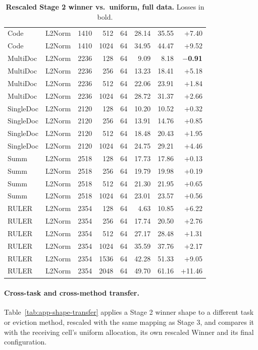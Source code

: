 \begin{table}[t]
\begin{tabular}{@{}l l r r r r r r@{}}
    Code & L2Norm & 1410 & 512 & 64 & 28.14 & 35.55 & +7.40 \\
    Code & L2Norm & 1410 & 1024 & 64 & 34.95 & 44.47 & +9.52 \\
    MultiDoc & L2Norm & 2236 & 128 & 64 & 9.09 & 8.18 & \textbf{$-$0.91} \\
    MultiDoc & L2Norm & 2236 & 256 & 64 & 13.23 & 18.41 & +5.18 \\
    MultiDoc & L2Norm & 2236 & 512 & 64 & 22.06 & 23.91 & +1.84 \\
    MultiDoc & L2Norm & 2236 & 1024 & 64 & 28.72 & 31.37 & +2.66 \\
    SingleDoc & L2Norm & 2120 & 128 & 64 & 10.20 & 10.52 & +0.32 \\
    SingleDoc & L2Norm & 2120 & 256 & 64 & 13.91 & 14.76 & +0.85 \\
    SingleDoc & L2Norm & 2120 & 512 & 64 & 18.48 & 20.43 & +1.95 \\
    SingleDoc & L2Norm & 2120 & 1024 & 64 & 24.75 & 29.21 & +4.46 \\
    Summ & L2Norm & 2518 & 128 & 64 & 17.73 & 17.86 & +0.13 \\
    Summ & L2Norm & 2518 & 256 & 64 & 19.79 & 19.98 & +0.19 \\
    Summ & L2Norm & 2518 & 512 & 64 & 21.30 & 21.95 & +0.65 \\
    Summ & L2Norm & 2518 & 1024 & 64 & 23.01 & 23.57 & +0.56 \\
    RULER & L2Norm & 2354 & 128 & 64 & 4.63 & 10.85 & +6.22 \\
    RULER & L2Norm & 2354 & 256 & 64 & 17.74 & 20.50 & +2.76 \\
    RULER & L2Norm & 2354 & 512 & 64 & 27.17 & 28.48 & +1.31 \\
    RULER & L2Norm & 2354 & 1024 & 64 & 35.59 & 37.76 & +2.17 \\
    RULER & L2Norm & 2354 & 1536 & 64 & 42.28 & 51.33 & +9.05 \\
    RULER & L2Norm & 2354 & 2048 & 64 & 49.70 & 61.16 & +11.46 \\
    \bottomrule
  \end{tabular}
  \caption{\textbf{Rescaled Stage 2 winner vs.\ uniform, full data.} Losses in bold.}
  \label{tab:app-transfer}
\end{table}


\paragraph{Cross-task and cross-method transfer.} Table~\ref{tab:app-shape-transfer} applies a Stage 2 winner shape to a different task or eviction method, rescaled with the same mapping as Stage 3, and compares it with the receiving cell's uniform allocation, its own rescaled Winner and its final configuration.

